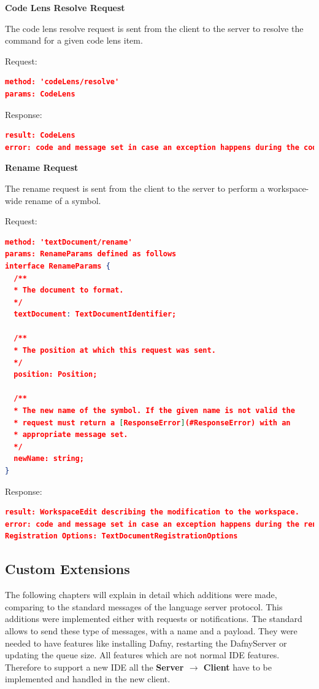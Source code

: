 \textbf{Code Lens Resolve Request}

The code lens resolve request is sent from the client to the server to resolve the command for a given code lens item.

Request:
\begin{lstlisting}[language=json,firstnumber=1]
method: 'codeLens/resolve'
params: CodeLens
\end{lstlisting}

Response:
\begin{lstlisting}[language=json,firstnumber=1]
result: CodeLens
error: code and message set in case an exception happens during the code lens resolve request.
\end{lstlisting}

\textbf{Rename Request}

The rename request is sent from the client to the server to perform a workspace-wide rename of a symbol.

Request:
\begin{lstlisting}[language=json,firstnumber=1]
method: 'textDocument/rename'
params: RenameParams defined as follows
interface RenameParams {
  /**
  * The document to format.
  */
  textDocument: TextDocumentIdentifier;

  /**
  * The position at which this request was sent.
  */
  position: Position;

  /**
  * The new name of the symbol. If the given name is not valid the
  * request must return a [ResponseError](#ResponseError) with an
  * appropriate message set.
  */
  newName: string;
}
\end{lstlisting}
Response:
\begin{lstlisting}[language=json,firstnumber=1]
result: WorkspaceEdit describing the modification to the workspace.
error: code and message set in case an exception happens during the rename request.
Registration Options: TextDocumentRegistrationOptions
\end{lstlisting}


\subsection{Custom Extensions}\label{custom commands}
The following chapters will explain in detail which additions were made, comparing to the standard messages of the language server protocol. This additions were implemented either with requests or notifications. The standard allows to send these type of messages, with a name and a payload.
They were needed to have features like installing Dafny, restarting the DafnyServer or updating the queue size. All features which are not normal IDE features. 
Therefore to support a new IDE all the \textbf{Server $\longrightarrow$ Client} have to be implemented and handled in the new client.

